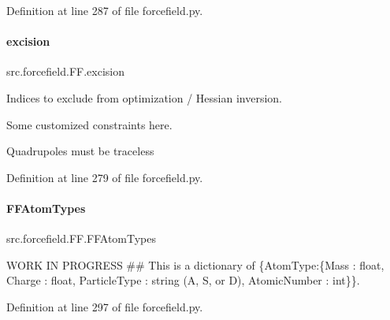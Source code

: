 Definition at line 287 of file forcefield.\+py.

\mbox{\label{classsrc_1_1forcefield_1_1FF_aa3cf5182a95b90bb874651b6a1dcd820}} 
\paragraph{\texorpdfstring{excision}{excision}}
{\footnotesize\ttfamily src.\+forcefield.\+F\+F.\+excision}



Indices to exclude from optimization / Hessian inversion. 

Some customized constraints here.

Quadrupoles must be traceless 

Definition at line 279 of file forcefield.\+py.

\mbox{\label{classsrc_1_1forcefield_1_1FF_a7c4998b78683e8e8fb11d5de7195735f}} 
\paragraph{\texorpdfstring{F\+F\+Atom\+Types}{FFAtomTypes}}
{\footnotesize\ttfamily src.\+forcefield.\+F\+F.\+F\+F\+Atom\+Types}



W\+O\+RK IN P\+R\+O\+G\+R\+E\+SS \#\# This is a dictionary of \{\textquotesingle{}Atom\+Type\textquotesingle{}\+:\{\textquotesingle{}Mass\textquotesingle{} \+: float, \textquotesingle{}Charge\textquotesingle{} \+: float, \textquotesingle{}Particle\+Type\textquotesingle{} \+: string (\textquotesingle{}A\textquotesingle{}, \textquotesingle{}S\textquotesingle{}, or \textquotesingle{}D\textquotesingle{}), \textquotesingle{}Atomic\+Number\textquotesingle{} \+: int\}\}. 



Definition at line 297 of file forcefield.\+py.

\mbox{\label{classsrc_1_1forcefield_1_1FF_a6cfb305bb2e714f4bae9ce08379ac8a9}} 
